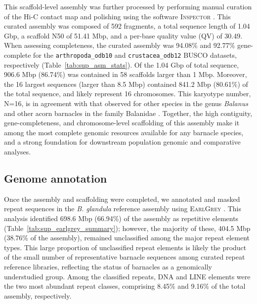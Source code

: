 \documentclass[11pt]{article}
\newcommand{\bgla}{\textit{B. glandula}\xspace}
\begin{document}
This scaffold-level assembly was further processed by performing manual curation
of the Hi-C contact map and polishing using the software \textsc{Inspector}
\citep{chen_accurate_2021}. This curated assembly was composed of 592 fragments,
a total sequence length of 1.04 Gbp, a scaffold N50 of 51.41 Mbp, and a per-base
quality value (QV) of 30.49. When assessing completeness, the curated assembly was
94.08\% and 92.77\% gene-complete for the \texttt{arthropoda\_odb10} and
\texttt{crustacea\_odb12} \textsc{BUSCO} datasets, respectively
(Table~\ref{tab:sup_asm_stats}). Of the 1.04 Gbp of total sequence,
906.6 Mbp (86.74\%) was contained in 58 scaffolds larger than 1 Mbp. Moreover,
the 16 largest sequences (larger than 8.5 Mbp) contained 841.2 Mbp (80.61\%) of
the total sequence, and likely represent 16 chromosomes. This karyotype
number, N=16, is in agreement with that observed for other species in the genus
\textit{Balanus} \citep{austin_chromosome_1958} and other acorn barnacles in the
family Balanidae \citep{han_new_2024}.
Together, the high contiguity, gene-completeness, and chromosome-level scaffolding
of this assembly make it among the most complete genomic resources available for
any barnacle species, and a strong foundation for downstream population genomic
and comparative analyses.

\subsection*{Genome annotation}


Once the assembly and scaffolding were completed, we annotated and masked repeat
sequences in the \bgla{} reference assembly using \textsc{EarlGrey}
\citep{baril_earl_2024}. This analysis identified 698.6 Mbp (66.94\%)
of the assembly as repetitive elements (Table~\ref{tab:sup_earlgrey_summary});
however, the majority of these, 404.5 Mbp (38.76\% of the assembly), remained
unclassified among the major repeat element types. This large proportion of
unclassified repeat elements is likely the product of the small number of
representative barnacle sequences among curated repeat reference libraries,
reflecting the status of barnacles as a genomically understudied group. Among the
classified repeats, DNA and LINE elements were the two most abundant repeat
classes, comprising 8.45\% and 9.16\% of the total assembly, respectively.
\vspace{0.2cm}
\end{document}
